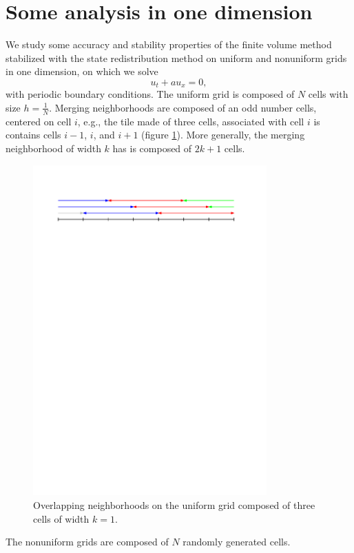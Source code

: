 \section{Some analysis in one dimension}\label{sec:theory}


We study some accuracy and stability properties of the finite volume method stabilized with the state redistribution method on uniform and nonuniform grids in one dimension, on which we solve
$$
u_t + a u_x = 0,
$$
with periodic boundary conditions.  
The uniform grid is composed of $N$ cells with size $h = \frac{1}{N}$.  Merging neighborhoods are composed of an odd number cells, centered on cell $i$, e.g., the tile made of three cells, associated with cell $i$ is contains cells $i-1$, $i$, and $i+1$ (figure \ref{fig:overlapping1D}).
More generally, the merging neighborhood of width $k$ has is composed of $2k+1$ cells.
\begin{figure}
    \centering
    \includegraphics[width = 0.8\textwidth]{figs/overlapping1D.pdf}
    \caption{Overlapping neighborhoods on the uniform grid composed of three cells of width $k=1$.}
    \label{fig:overlapping1D}
\end{figure}
The nonuniform grids are composed of $N$ randomly generated cells.


